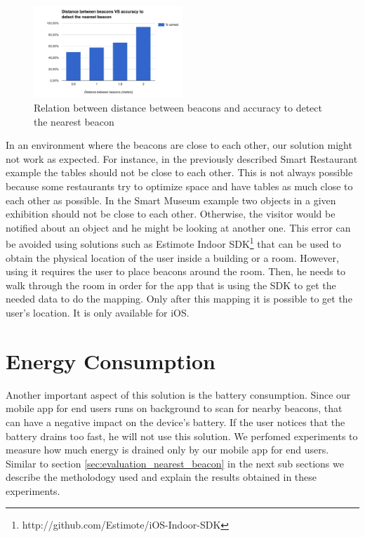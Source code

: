 \begin{figure}[!ht]
  \centering
    \includegraphics[width=0.5\textwidth, keepaspectratio]{images/results_nearest_beacon}
    \caption[Distance between beacons vs Accuracy]{Relation between distance between beacons and accuracy to detect the nearest beacon}
    \label{fig:results_experiments_nearest_beacon}
\end{figure}

In an environment where the beacons are close to each other, our solution might not work as expected.
For instance, in the previously described Smart Restaurant example
the tables should not be close to each other. This is not always possible because some restaurants try to optimize space and have tables as much close to each other as possible.
In the Smart Museum example two objects in a given exhibition should not be close to each other.
Otherwise, the visitor would be notified about an object and he might be looking at another one.
This error can be avoided using solutions such as Estimote Indoor \gls{SDK}\footnote{http://github.com/Estimote/iOS-Indoor-SDK} that can be used to obtain the physical location of the user inside a building or a room.
However, using it requires the user to place beacons around the room.
Then, he needs to walk through the room in order for the app that is using the \gls{SDK} to get the needed data to do the mapping.
Only after this mapping it is possible to get the user's location.
It is only available for iOS.

\section{Energy Consumption}
\label{sec:evaluation_energy_consumption}
Another important aspect of this solution is the battery consumption.
Since our mobile app for end users runs on background to scan for nearby beacons, that can have a negative impact on the device's battery. If the user notices that the battery drains too fast, he will not use this solution.
We perfomed experiments to measure how much energy is drained only by our mobile app for end users.
Similar to section \ref{sec:evaluation_nearest_beacon} in the next sub sections we describe the metholodogy used and explain the results obtained in these experiments.

